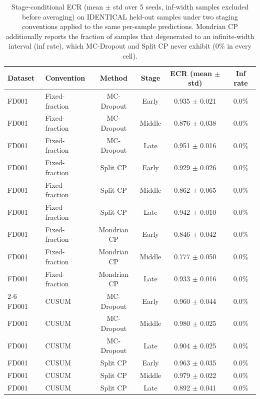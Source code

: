 \begin{table}[t]
\caption{Stage-conditional ECR (mean $\pm$ std over 5 seeds, inf-width samples excluded before averaging) on IDENTICAL held-out samples under two staging conventions applied to the same per-sample predictions. Mondrian CP additionally reports the fraction of samples that degenerated to an infinite-width interval (inf rate), which MC-Dropout and Split CP never exhibit (0\% in every cell).}
\label{tab:main-relabeled}
\centering
\small
\begin{tabular}{llcccc}
\toprule
Dataset & Convention & Method & Stage & ECR (mean $\pm$ std) & Inf rate \\
\midrule
FD001 & Fixed-fraction & MC-Dropout & Early & 0.935 $\pm$ 0.021 & 0.0\% \\
FD001 & Fixed-fraction & MC-Dropout & Middle & 0.876 $\pm$ 0.038 & 0.0\% \\
FD001 & Fixed-fraction & MC-Dropout & Late & 0.951 $\pm$ 0.016 & 0.0\% \\
FD001 & Fixed-fraction & Split CP & Early & 0.929 $\pm$ 0.026 & 0.0\% \\
FD001 & Fixed-fraction & Split CP & Middle & 0.862 $\pm$ 0.065 & 0.0\% \\
FD001 & Fixed-fraction & Split CP & Late & 0.942 $\pm$ 0.010 & 0.0\% \\
FD001 & Fixed-fraction & Mondrian CP & Early & 0.846 $\pm$ 0.042 & 0.0\% \\
FD001 & Fixed-fraction & Mondrian CP & Middle & 0.777 $\pm$ 0.050 & 0.0\% \\
FD001 & Fixed-fraction & Mondrian CP & Late & 0.933 $\pm$ 0.016 & 0.0\% \\
\cmidrule{2-6}
FD001 & CUSUM & MC-Dropout & Early & 0.960 $\pm$ 0.044 & 0.0\% \\
FD001 & CUSUM & MC-Dropout & Middle & 0.980 $\pm$ 0.025 & 0.0\% \\
FD001 & CUSUM & MC-Dropout & Late & 0.904 $\pm$ 0.025 & 0.0\% \\
FD001 & CUSUM & Split CP & Early & 0.963 $\pm$ 0.035 & 0.0\% \\
FD001 & CUSUM & Split CP & Middle & 0.979 $\pm$ 0.022 & 0.0\% \\
FD001 & CUSUM & Split CP & Late & 0.892 $\pm$ 0.041 & 0.0\% \\

\end{tabular}
\end{table}
